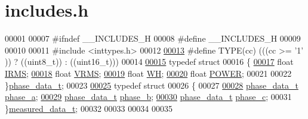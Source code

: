 \hypertarget{a00037}{\section{includes.\-h}
\label{d1/dc6/a00037}
}

\begin{DoxyCode}
00001 
00007 \textcolor{preprocessor}{#ifndef \_\_INCLUDES\_H}
00008 \textcolor{preprocessor}{}\textcolor{preprocessor}{#define \_\_INCLUDES\_H}
00009 \textcolor{preprocessor}{}
00010 
00011 \textcolor{preprocessor}{#include <inttypes.h>}
00012 
\hypertarget{a00037_source_l00013}{}\hyperlink{a00037_ac8f6b0114f40d7bc2177f638088ae0ab}{00013} \textcolor{preprocessor}{#define TYPE(cc)  (((cc >= '1' )) ? ((uint8\_t)) : ((uint16\_t)))}
00014 \textcolor{preprocessor}{}
\hypertarget{a00037_source_l00015}{}\hyperlink{a00030}{00015} \textcolor{keyword}{typedef} \textcolor{keyword}{struct}
00016 \{
\hypertarget{a00037_source_l00017}{}\hyperlink{a00030_a4f87f30b543e89e2e5dfa1b8f3f58eff}{00017}      \textcolor{keywordtype}{float} \hyperlink{a00030_a4f87f30b543e89e2e5dfa1b8f3f58eff}{IRMS};
\hypertarget{a00037_source_l00018}{}\hyperlink{a00030_a08415029e214174a01bc6487ff98ee9b}{00018}      \textcolor{keywordtype}{float} \hyperlink{a00030_a08415029e214174a01bc6487ff98ee9b}{VRMS};
\hypertarget{a00037_source_l00019}{}\hyperlink{a00030_a8dd6d8406db4e214238b3eff481e4ea0}{00019}      \textcolor{keywordtype}{float} \hyperlink{a00030_a8dd6d8406db4e214238b3eff481e4ea0}{WH};
\hypertarget{a00037_source_l00020}{}\hyperlink{a00030_a8a9794fa4c6a69b457d1eb04b017ef1e}{00020}      \textcolor{keywordtype}{float} \hyperlink{a00030_a8a9794fa4c6a69b457d1eb04b017ef1e}{POWER};
00021      
00022 \}\hyperlink{a00030}{phase\_data\_t};
00023 
\hypertarget{a00037_source_l00025}{}\hyperlink{a00029}{00025} \textcolor{keyword}{typedef} \textcolor{keyword}{struct}
00026 \{
00027  
\hypertarget{a00037_source_l00028}{}\hyperlink{a00029_ad7205e9853a503d2fab0697f5a301f6c}{00028}      \hyperlink{a00030}{phase\_data\_t} \hyperlink{a00029_ad7205e9853a503d2fab0697f5a301f6c}{phase\_a};
\hypertarget{a00037_source_l00029}{}\hyperlink{a00029_a48734adeb4d59d056b6e39c6e08fe21e}{00029}      \hyperlink{a00030}{phase\_data\_t} \hyperlink{a00029_a48734adeb4d59d056b6e39c6e08fe21e}{phase\_b};
\hypertarget{a00037_source_l00030}{}\hyperlink{a00029_ad8892f27909cf51f7603adfc00d224df}{00030}      \hyperlink{a00030}{phase\_data\_t} \hyperlink{a00029_ad8892f27909cf51f7603adfc00d224df}{phase\_c};      
00031 \}\hyperlink{a00029}{measured\_data\_t};
00032 
00033 
00034 
00035 

\end{DoxyCode}
